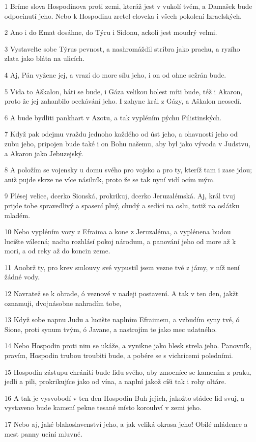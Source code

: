 \par 1 Bríme slova Hospodinova proti zemi, kteráž jest v vukolí tvém, a Damašek bude odpocinutí jeho. Nebo k Hospodinu zretel cloveka i všech pokolení Izraelských.
\par 2 Ano i do Emat dosáhne, do Týru i Sidonu, ackoli jest moudrý velmi.
\par 3 Vystavelte sobe Týrus pevnost, a nashromáždil stríbra jako prachu, a ryzího zlata jako bláta na ulicích.
\par 4 Aj, Pán vyžene jej, a vrazí do more sílu jeho, i on od ohne sežrán bude.
\par 5 Vida to Aškalon, báti se bude, i Gáza velikou bolest míti bude, též i Akaron, proto že jej zahanbilo ocekávání jeho. I zahyne král z Gázy, a Aškalon neosedí.
\par 6 A bude bydliti pankhart v Azotu, a tak vypléním pýchu Filistinských.
\par 7 Když pak odejmu vraždu jednoho každého od úst jeho, a ohavnosti jeho od zubu jeho, pripojen bude také i on Bohu našemu, aby byl jako vývoda v Judstvu, a Akaron jako Jebuzejský.
\par 8 A položím se vojensky u domu svého pro vojsko a pro ty, kteríž tam i zase jdou; aniž pujde skrze ne více násilník, proto že se tak nyní vidí ocím mým.
\par 9 Plésej velice, dcerko Sionská, prokrikuj, dcerko Jeruzalémská. Aj, král tvuj prijde tobe spravedlivý a spasení plný, chudý a sedící na oslu, totiž na oslátku mladém.
\par 10 Nebo vypléním vozy z Efraima a kone z Jeruzaléma, a vyplénena budou lucište válecná; nadto rozhlásí pokoj národum, a panování jeho od more až k mori, a od reky až do koncin zeme.
\par 11 Anobrž ty, pro krev smlouvy své vypustil jsem vezne tvé z jámy, v níž není žádné vody.
\par 12 Navratež se k ohrade, ó veznové v nadeji postavení. A tak v ten den, jakžt oznamuji, dvojnásobne nahradím tobe,
\par 13 Když sobe napnu Judu a lucište naplním Efraimem, a vzbudím syny tvé, ó Sione, proti synum tvým, ó Javane, a nastrojím te jako mec udatného.
\par 14 Nebo Hospodin proti nim se ukáže, a vynikne jako blesk strela jeho. Panovník, pravím, Hospodin trubou troubiti bude, a pobére se s vichricemi poledními.
\par 15 Hospodin zástupu chrániti bude lidu svého, aby zmocníce se kamením z praku, jedli a pili, prokrikujíce jako od vína, a naplní jakož cíši tak i rohy oltáre.
\par 16 A tak je vysvobodí v ten den Hospodin Buh jejich, jakožto stádce lid svuj, a vystaveno bude kamení pekne tesané místo korouhví v zemi jeho.
\par 17 Nebo aj, jaké blahoslavenství jeho, a jak veliká okrasa jeho! Obilé mládence a mest panny uciní mluvné.

